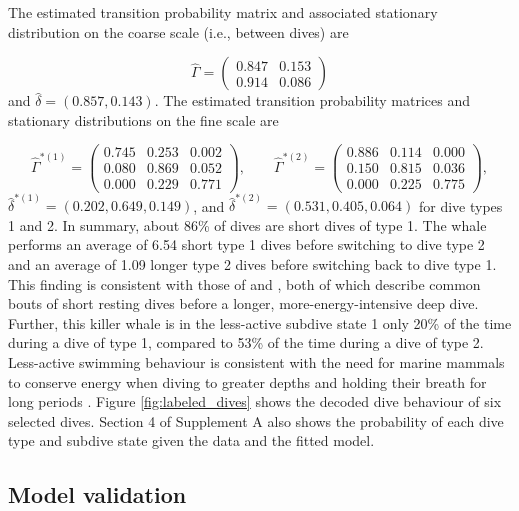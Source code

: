 The estimated transition probability matrix and associated stationary distribution on the coarse scale (i.e., between dives) are

\[\hat \Gamma = \begin{pmatrix} 
0.847 & 0.153 \\
0.914 & 0.086
\end{pmatrix}\]
%
and $\hat \delta = \left(0.857, 0.143 \right)$. The estimated transition probability matrices and stationary distributions on the fine scale are 

\[\hat \Gamma^{*(1)} = \begin{pmatrix} 
0.745 & 0.253 & 0.002 \\
0.080 & 0.869 & 0.052 \\
0.000 & 0.229 & 0.771
\end{pmatrix}, \qquad 
\hat \Gamma^{*(2)} = \begin{pmatrix} 
0.886 & 0.114 & 0.000 \\
0.150 & 0.815 & 0.036 \\
0.000 & 0.225 & 0.775
\end{pmatrix},\]
%
$\hat \delta^{*(1)} = \left(0.202, 0.649, 0.149\right)$, and $\hat \delta^{*(2)} = \left( 0.531, 0.405, 0.064 \right)$ for dive types 1 and 2.
In summary, about 86\% of dives are short dives of type 1. The whale performs an average of 6.54 short type 1 dives before switching to dive type 2 and an average of 1.09 longer type 2 dives before switching back to dive type 1. This finding is consistent with those of \citet{Tennessen:2019b} and \citet{Williams:2009}, both of which describe common bouts of short resting dives before a longer, more-energy-intensive deep dive.
Further, this killer whale is in the less-active subdive state 1 only 20\% of the time during a dive of type 1, compared to 53\% of the time during a dive of type 2. Less-active swimming behaviour is consistent with the need for marine mammals to conserve energy when diving to greater depths and holding their breath for long periods \citep{Williams:1999,Hastie:2006}. Figure \ref{fig:labeled_dives} shows the decoded dive behaviour of six selected dives. Section 4 of Supplement A also shows the probability of each dive type and subdive state given the data and the fitted model.

\subsection{Model validation}
\label{subsec:model_validation}

